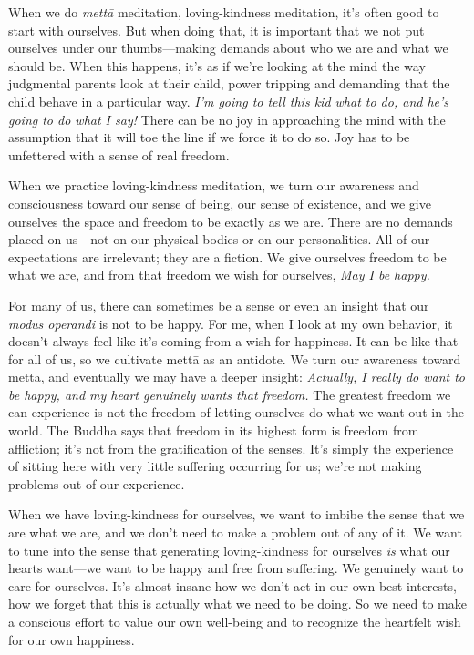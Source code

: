 
When we do \emph{mettā} meditation, loving-kindness meditation, it's 
often good to start with ourselves. But when doing that, it is 
important that we not put ourselves under our thumbs---making demands 
about who we are and what we should be. When this happens, it's as if 
we're looking at the mind the way judgmental parents look at their 
child, power tripping and demanding that the child behave in a 
particular way. \emph{I'm going to tell this kid what to do, and he's 
going to do what I say!} There can be no joy in approaching the mind 
with the assumption that it will toe the line if we force it to do so. 
Joy has to be unfettered with a sense of real freedom.

When we practice loving-kindness meditation, we turn our awareness and 
consciousness toward our sense of being, our sense of existence, and we 
give ourselves the space and freedom to be exactly as we are. There are 
no demands placed on us---not on our physical bodies or on our 
personalities. All of our expectations are irrelevant; they are a 
fiction. We give ourselves freedom to be what we are, and from that 
freedom we wish for ourselves, \emph{May I be happy.}

For many of us, there can sometimes be a sense or even an insight that 
our \emph{modus operandi} is not to be happy. For me, when I look at my 
own behavior, it doesn't always feel like it's coming from a wish for 
happiness. It can be like that for all of us, so we cultivate mettā as 
an antidote. We turn our awareness toward mettā, and eventually we may 
have a deeper insight: \emph{Actually, I really do want to be happy, 
and my heart genuinely wants that freedom.} The greatest freedom we can 
experience is not the freedom of letting ourselves do what we want out 
in the world. The Buddha says that freedom in its highest form is 
freedom from affliction; it's not from the gratification of the senses. 
It's simply the experience of sitting here with very little suffering 
occurring for us; we're not making problems out of our experience.

When we have loving-kindness for ourselves, we want to imbibe the sense 
that we are what we are, and we don't need to make a problem out of any 
of it. We want to tune into the sense that generating loving-kindness 
for ourselves \emph{is} what our hearts want---we want to be happy and 
free from suffering. We genuinely want to care for ourselves. It's 
almost insane how we don't act in our own best interests, how we forget 
that this is actually what we need to be doing. So we need to make a 
conscious effort to value our own well-being and to recognize the 
heartfelt wish for our own happiness.

